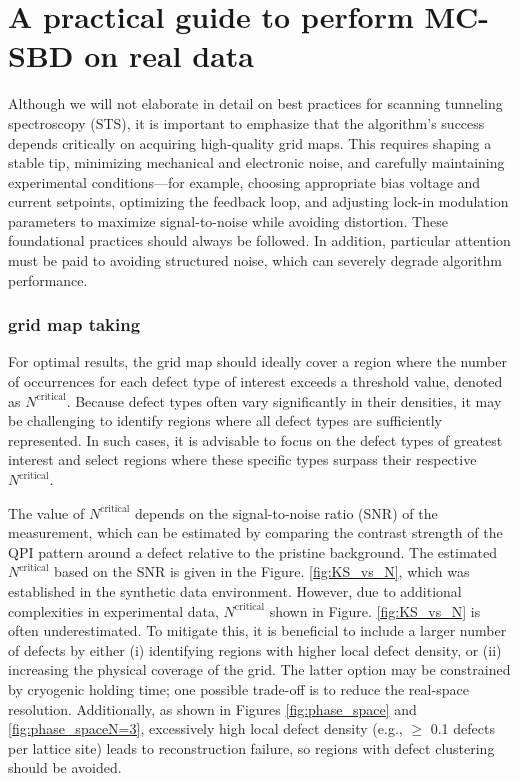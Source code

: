 \section{A practical guide to perform MC-SBD on real data}
Although we will not elaborate in detail on best practices for scanning tunneling spectroscopy (STS), it is important to emphasize that the algorithm’s success depends critically on acquiring high-quality grid maps. This requires shaping a stable tip, minimizing mechanical and electronic noise, and carefully maintaining experimental conditions—for example, choosing appropriate bias voltage and current setpoints, optimizing the feedback loop, and adjusting lock-in modulation parameters to maximize signal-to-noise while avoiding distortion. These foundational practices should always be followed. In addition, particular attention must be paid to avoiding structured noise, which can severely degrade algorithm performance.

\subsubsection{grid map taking}
For optimal results, the grid map should ideally cover a region where the number of occurrences for each defect type of interest exceeds a threshold value, denoted as $N^{\text{critical}}$. Because defect types often vary significantly in their densities, it may be challenging to identify regions where all defect types are sufficiently represented. In such cases, it is advisable to focus on the defect types of greatest interest and select regions where these specific types surpass their respective $N^{\text{critical}}$.

The value of $N^{\text{critical}}$ depends on the signal-to-noise ratio (SNR) of the measurement, which can be estimated by comparing the contrast strength of the QPI pattern around a defect relative to the pristine background. The estimated $N^{\text{critical}}$ based on the SNR is given in the Figure. \ref{fig:KS_vs_N}, which was established in the synthetic data environment. However, due to additional complexities in experimental data, $N^{\text{critical}}$ shown in Figure. \ref{fig:KS_vs_N} is often underestimated. To mitigate this, it is beneficial to include a larger number of defects by either (i) identifying regions with higher local defect density, or (ii) increasing the physical coverage of the grid. The latter option may be constrained by cryogenic holding time; one possible trade-off is to reduce the real-space resolution. Additionally, as shown in Figures \ref{fig:phase_space} and \ref{fig:phase_spaceN=3}, excessively high local defect density (e.g., $\geq$ 0.1 defects per lattice site) leads to reconstruction failure, so regions with defect clustering should be avoided.


